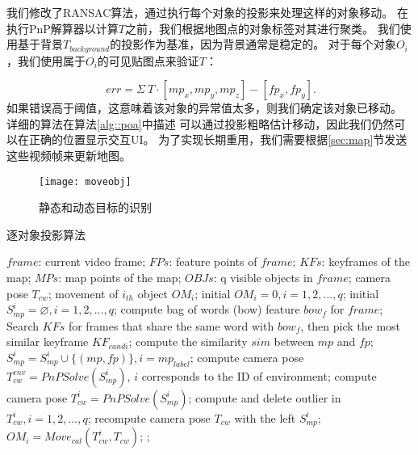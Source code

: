 我们修改了RANSAC算法，通过执行每个对象的投影来处理这样的对象移动。
在执行PnP解算器以计算$T$之前，我们根据地图点的对象标签对其进行聚类。
我们使用基于背景$T_{background}$的投影作为基准，因为背景通常是稳定的。
对于每个对象$O_i$，我们使用属于$O_i$的可见贴图点来验证$T$：

\begin{equation}\label{equ:gdt}
\
err = \Sigma \ T \cdot [mp_x, mp_y, mp_z] - [fp_x, fp_y].
\end{equation}
如果错误高于阈值，这意味着该对象的异常值太多，则我们确定该对象已移动。
详细的算法在算法\ref{alg::poa}中描述
可以通过投影粗略估计移动，因此我们仍然可以在正确的位置显示交互UI。
为了实现长期重用，我们需要根据\ref{sec:map}节发送这些视频帧来更新地图。


\begin{figure}[t]
	\centering
	\texttt{[image: moveobj]}
	\caption{静态和动态目标的识别}
	\label{fig:move}
\end{figure}

\begin{algorithm}[t]  
	\caption{逐对象投影算法}  
	\label{alg::poa}  
	\begin{algorithmic}[1]  
		\Require  
		$frame$: current video frame;
		$FPs$: feature points of $frame$;  
		$KFs$: keyframes of the map;  
		$MPs$: map points of the map;
		$OBJs$: q visible objects in $frame$;   
		\Ensure  
		camera pose $T_{cw}$;
		movement of $i_{th}$ object $OM_i$;
		\State initial $OM_i=0, i = 1,2,...,q$;
		\State initial $S_{mp}^i=\varnothing, i=1,2,...,q$;
		\State compute bag of words (bow) feature $bow_f$ for $frame$;
		\State Search $KFs$ for frames that share the same word with $bow_f$, then pick the most similar keyframe $KF_{candi}$;
		\For{each $mp\in KF_{candi}$}
		compute the similarity $sim$ between $mp$ and $fp$;
		\State $S_{mp}^i = S_{mp}^i\cup\{(mp,fp)\}, i = mp_{label}$;
		\EndIf
		\EndFor 
		\EndFor
		\State compute camera pose $T_{cw}^{env} = PnPSolve(S_{mp}^i)$, $i$ corresponds to the ID of environment;
		\For{each $obj\in OBJs$}
		\State compute camera pose $T_{cw}^{i} = PnPSolve(S_{mp}^i)$;
		\EndFor
		\EndFor
		\State compute and delete outlier in ${T_{cw}^{i}, i=1,2,...,q}$;
		\State recompute camera pose $T_{cw}$ with the left $S_{mp}^i$;
		\State $OM_i = Move_{cal}(T_{cw}^{i}, T_{cw})$; 
		\Else 
		;
		\EndIf
	\end{algorithmic}
\end{algorithm}  

